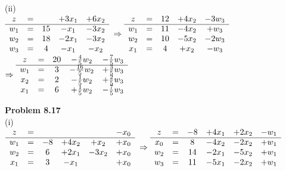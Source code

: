 \documentclass[letterpaper,12pt]{article}
\theoremstyle{definition}
\begin{document}
(ii)\\

$
\begin{array}{c c c c c}
z & =& & +3x_1& +6x_2 \\
\cline{1-5}
w_1 & =&15 & -x_1& -3x_2 \\
w_2 & =&18 & -2x_1& -3x_2 \\
w_3 & =&4 & -x_1& - x_2 \\
\end{array}
$
\vspace{0.2in}
$
\Rightarrow
\begin{array}{c c c c c}
z & =& 12 & +4x_2& -3w_3 \\
\cline{1-5}
w_1 & =&11 & -4x_2& +w_3 \\
w_2 & =&10 & -5x_2& -2w_3 \\
x_1 & =&4 & +x_2& - w_3 \\
\end{array}
$
\vspace{0.2in}
$
\Rightarrow
\begin{array}{c c c c c}
z & =& 20 & -\frac{4}{5}w_2& - \frac{7}{5}w_3 \\
\cline{1-5}
w_1 & =&3 &-\frac{16}{5}w_2& + \frac{3}{5}w_3 \\
x_2 & =&2 & - \frac{1}{5}w_2& + \frac{2}{5}w_3 \\
x_1 & =&6 & +\frac{1}{5}w_2& - \frac{7}{5}w_3 \\
\end{array}\\
$

\noindent\textbf{Problem 8.17}\\

(i)\\

$
\begin{array}{c c c c c c}
z & =&  & &  & -x_0\\
\cline{1-6}
w_1 & =&-8 & +4x_2& +x_2 & +x_0\\
w_2 & =&6 & +2x_1& -3x_2 &+x_0\\
x_1 & =&3 & -x_1& &+x_0 \\
\end{array}
$
\vspace{0.2in}
$
\Rightarrow
\begin{array}{c c c c c c}
z & =& -8  & +4x_1& +2x_2 & -w_1\\
\cline{1-6}
x_0 & =&8 & -4x_2& -2x_2 & +w_1\\
w_2 & =&14& -2x_1& -5x_2 &+w_1\\
w_3 & =&11 & -5x_1& -2x_2 &+w_1 \\
\end{array}
$
\end{document}
